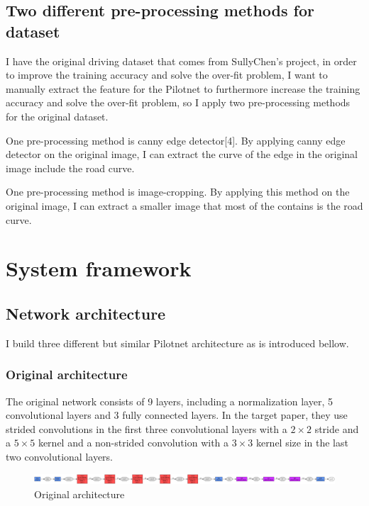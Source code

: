 \documentclass[10pt,twocolumn,letterpaper]{article}
\begin{document}
\subsection{Two different pre-processing methods for dataset}

I have the original driving dataset that comes from SullyChen's project, in order to improve the training accuracy and solve the over-fit problem, I want to manually extract the feature for the Pilotnet to furthermore increase the training accuracy and solve the over-fit problem, so I apply two pre-processing methods for the original dataset. \par
One pre-processing method is canny edge detector[4]. By applying canny edge detector on the original image, I can extract the curve of the edge in the original image include the road curve. \par
One pre-processing method is image-cropping. By applying this method on the original image, I can extract a smaller image that most of the contains is the road curve. \par




\section{System framework}


\subsection{Network architecture}
I build three different but similar Pilotnet architecture as is introduced bellow.
\subsubsection{Original architecture}
The original network consists of 9 layers, including a normalization layer, 5 convolutional layers and 3 fully connected layers. In the target paper, they use strided convolutions in the first three convolutional layers with a $2\times 2$ stride and a $5\times 5$ kernel and a non-strided convolution with a $3\times 3$ kernel size in the last two convolutional layers.

\begin{figure}[h]
	\begin{center}
		
		\includegraphics[width=0.8\linewidth]{pilotnet_deploy_original.png}
	\end{center}
	\caption{Original architecture}
	\label{fig:long1}
	\label{fig:onecol1}
\end{figure}
\end{document}
